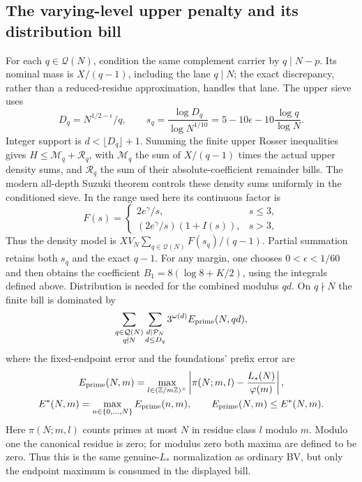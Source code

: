 \subsection{The varying-level upper penalty and its distribution bill}
For each $q\in\mathcal Q(N)$, condition the same complement carrier by
$q\mid N-p$.  Its nominal mass is $X/(q-1)$, including the lane $q\mid N$;
the exact discrepancy, rather than a reduced-residue approximation, handles
that lane.  The upper sieve uses
\[
 D_q=N^{1/2-\epsilon}/q,\qquad
 s_q=\frac{\log D_q}{\log N^{1/10}}
     =5-10\epsilon-10\frac{\log q}{\log N}.
\]
Integer support is $d<\lfloor D_q\rfloor+1$.  Summing the finite upper
Rosser inequalities gives $H\le\mathcal M_q+\mathcal R_q$, with
$\mathcal M_q$ the sum of $X/(q-1)$ times the actual upper density sums,
and $\mathcal R_q$ the sum of their absolute-coefficient remainder bills.
The modern all-depth Suzuki theorem controls these density sums uniformly
in the conditioned sieve.  In the range used here its continuous factor is
\[
 F(s)=\begin{cases}2e^\gamma/s,&s\le3,\\
 (2e^\gamma/s)(1+I(s)),&s>3,\end{cases}

\]
Thus the density model is $XV_N\sum_{q\in\mathcal Q(N)}F(s_q)/(q-1)$.
Partial summation retains both $s_q$ and the exact $q-1$.  For any margin, one chooses $0<\epsilon<1/60$ and then
obtains the coefficient $B_1=8(\log8+K/2)$, using the integrals defined above.
Distribution is needed for the combined modulus $qd$.  On $q\nmid N$
the finite bill is dominated by
\[
 \sum_{\substack{q\in\mathcal Q(N)\\q\nmid N}}
 \sum_{\substack{d\mid\mathcal P_N\\d\le D_q}}
       3^{\omega(d)}E_{\rm prime}(N,qd),
\]
where the fixed-endpoint error and the foundations' prefix error are
\[\begin{gathered}
 E_{\rm prime}(N,m)=\max_{l\in(\mathbb Z/m\mathbb Z)^\times}
   \left|\pi(N;m,l)-\frac{L_*(N)}{\varphi(m)}\right|,\\
 E^*(N,m)=\max_{n\in\{0,\ldots,N\}}E_{\rm prime}(n,m),
 \qquad E_{\rm prime}(N,m)\le E^*(N,m).
\end{gathered}\]
Here $\pi(N;m,l)$ counts primes at most $N$ in residue class $l$ modulo $m$.
Modulo one the canonical residue is zero; for modulus zero both maxima
are defined to be zero. Thus this is the same genuine-$L_*$ normalization
as ordinary BV, but only the endpoint maximum is consumed in the displayed bill.
